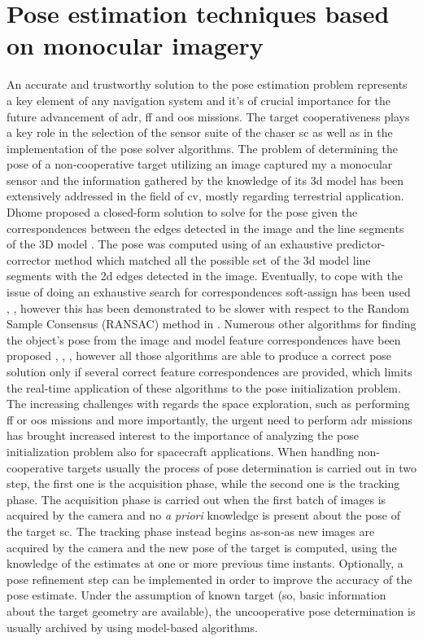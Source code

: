 \newpage

\section{Pose estimation techniques based on monocular imagery}
An accurate and trustworthy solution to the pose estimation problem represents a key element of any navigation system and it's of crucial importance for the future advancement of \acrshort{adr}, \acrshort{ff} and \acrshort{oos} missions. The target cooperativeness plays a key role in the selection of the sensor suite of the chaser \acrshort{sc} as well as in the implementation of the pose solver algorithms.
The problem of determining the pose of a non-cooperative target utilizing an image captured my a monocular sensor and the information gathered by the knowledge of its \acrshort{3d} model has been extensively addressed in the field of \acrshort{cv}, mostly regarding terrestrial application. Dhome proposed a closed-form solution to solve for the pose given the correspondences between the edges detected in the image and the line segments of the 3D model \cite{Dhome1989}. The pose was computed using of an exhaustive predictor-corrector method which matched all the possible set of the \acrshort{3d} model line segments with the \acrshort{2d} edges detected in the image. Eventually, to cope with the issue of doing an exhaustive search for correspondences soft-assign has been used \cite{Gold1994}, \cite{David2004}, however this has been demonstrated to be slower with respect to the Random Sample Consensus (RANSAC) method in \cite{Attia2016}. Numerous other algorithms for finding the object's pose from the image and model feature correspondences have been proposed \cite{Mirzaei2011}, \cite{Xu2017}, \cite{10.1007/s11263-008-0152-6}, however all those algorithms are able to produce a correct pose solution only if several correct feature correspondences are provided, which limits the real-time application of these algorithms to the pose initialization problem.
The increasing challenges with regards the space exploration, such as performing \acrshort{ff} or \acrshort{oos} missions and more importantly, the urgent need to perform \acrshort{adr} missions has brought increased interest to the importance of analyzing the pose initialization problem also for spacecraft applications. When handling non-cooperative targets usually the process of pose determination is carried out in two step, the first one is the acquisition phase, while the second one is the tracking phase. The acquisition phase is carried out when the first batch of images is acquired by the camera and no \textit{a priori} knowledge is present about the pose of the target \acrshort{sc}. The tracking phase instead begins as-son-as new images are acquired by the camera and the new pose of the target is computed, using the knowledge of the estimates at one or more previous time instants. Optionally, a pose refinement step can be implemented in order to improve the accuracy of the pose estimate. Under the assumption of known target (so, basic information about the target geometry are available), the uncooperative pose determination is usually archived by using model-based algorithms.
